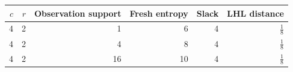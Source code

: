 \begin{tabular}{rrrrrr}
\toprule
$c$ & $r$ & Observation support & Fresh entropy & Slack & LHL distance \\
\midrule
4 & 2 & 1 & 6 & 4 & $\frac{1}{8}$ \\
4 & 2 & 4 & 8 & 4 & $\frac{1}{8}$ \\
4 & 2 & 16 & 10 & 4 & $\frac{1}{8}$ \\
\bottomrule
\end{tabular}
